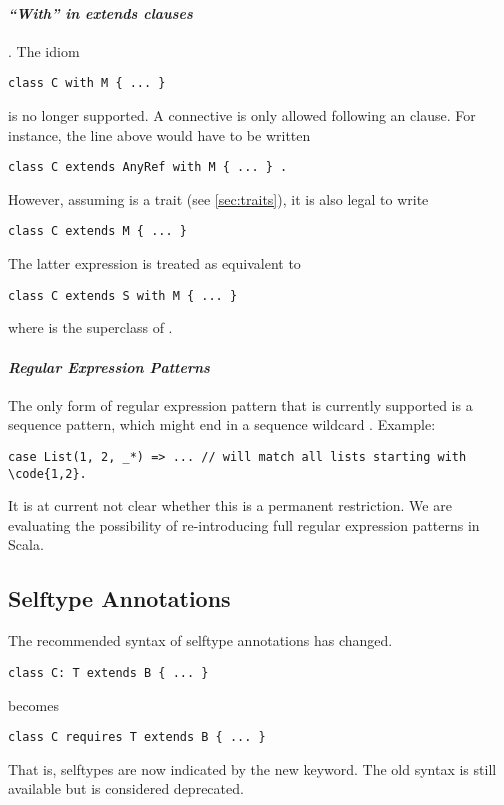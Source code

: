 \paragraph{\em ``With'' in extends clauses}. The idiom
\begin{lstlisting}
class C with M { ... }
\end{lstlisting}
is no longer supported. A \lstinline@with@ connective is only allowed
following an \lstinline@extends@ clause. For instance, the line
above would have to be written
\begin{lstlisting}
class C extends AnyRef with M { ... } .
\end{lstlisting}
However, assuming \lstinline@M@ is a trait (see
\ref{sec:traits}), it is also legal to write
\begin{lstlisting}
class C extends M { ... }
\end{lstlisting}
The latter expression is treated as equivalent to
\begin{lstlisting}
class C extends S with M { ... }
\end{lstlisting}
where \lstinline@S@ is the superclass of \lstinline@M@.

\paragraph{\em Regular Expression Patterns} The only form of regular
expression pattern that is currently supported is a sequence pattern,
which might end in a sequence wildcard \code{_*}. Example:
\begin{lstlisting}
case List(1, 2, _*) => ... // will match all lists starting with \code{1,2}.
\end{lstlisting}
It is at current not clear whether this is a permanent restriction. We
are evaluating the possibility of re-introducing full regular
expression patterns in Scala.

\subsection*{Selftype Annotations}

The recommended syntax of selftype annotations has changed. 
\begin{lstlisting}
class C: T extends B { ... }
\end{lstlisting}
becomes
\begin{lstlisting}
class C requires T extends B { ... }
\end{lstlisting}
That is, selftypes are now indicated by the new \lstinline@requires@
keyword. The old syntax is still available but is considered deprecated. 

